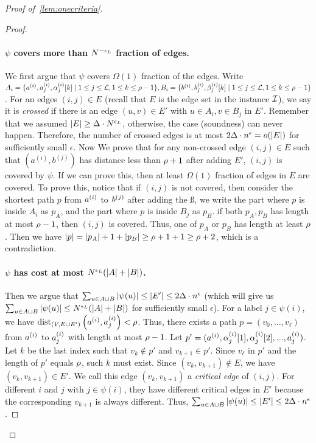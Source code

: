 \begin{proof}[Proof of~\cref{lem:onecriteria}]
\begin{proof}
		\paragraph{$\psi$ covers more than $N^{-\epsl}$ fraction of edges.}	We first argue that $\psi$ covers $\Omega(1)$ fraction of the edges. Write $A_i=\{\a{i},\aa{i}{j},\aaa{i}{j}{k}\mid 1\le j\le \L,1\le k\le \dia{}-1\}, B_i=\{\b{i},\bb{i}{j},\bbb{i}{j}{k}\mid 1\le j\le \L,1\le k\le \dia{}-1\}$. For an edges $(i,j)\in E$ (recall that $E$ is the edge set in the \labcov{} instance $\I$), we say it is \emph{crossed} if there is an edge $(u,v)\in E'$ with $u\in A_i,v\in B_j$ in $E'$. Remember that we assumed $|E|\ge \Delta\cdot N^{\epsl{}}$, otherwise, the case (soundness) can never happen. Therefore, the number of crossed edges is at most $2\AB\cdot n^{\epsilon}=o(|E|)$ for sufficiently small $\epsilon$. Now We prove that for any non-crossed edge $(i,j)\in E$ such that $(a^{(i)},b^{(j)})$ has distance less than $\dia{}+1$ after adding $E'$, $(i,j)$ is covered by $\psi$. If we can prove this, then at least $\Omega(1)$ fraction of edges in $E$ are covered. To prove this, notice that if $(i,j)$ is not covered, then consider the shortest path $p$ from $\a{i}$ to $\b{j}$ after adding the \ss{}, we write the part where $p$ is inside $A_i$ as $p_A$, and the part where $p$ is inside $B_j$ as $p_B$. if both $p_A,p_B$ has length at most $\dia{}-1$, then $(i,j)$ is covered. Thus, one of $p_A$ or $p_B$ has length at least $\dia{}$. Then we have $|p|=|p_A|+1+|p_B|\ge \dia{}+1+1\ge \dia{}+2$, which is a contradiction. 
		
		\paragraph{$\psi$ has cost at most $N^{\epsl}(|A|+|B|)$.} Then we argue that $\sum_{u\in A\cup B}|\psi(u)|\le |E'|\le 2\AB \cdot n^{\epsilon}$ (which will give us $\sum_{u\in A\cup B}|\psi(u)|\le N^{\epsl{}}(|A|+|B|)$ for sufficiently small $\epsilon$). For a label $j\in\psi(i)$, we have $\distt{(V,E\cup E')}{\a{i},\aa{i}{j}}<\dia{}$. Thus, there exists a path $p=(v_0,...,v_{\ell})$ from $\a{i}$ to $\aa{i}{j}$ with length at most $\dia{}-1$. Let $p'=(\a{i},\aaa{i}{j}{1},\aaa{i}{j}{2},...,\aa{i}{j})$. Let $k$ be the last index such that $v_k\not\in p'$ and $v_{k+1}\in p'$. Since $v_{\ell}$ in $p'$ and the length of $p'$ equals $\dia{}$, such $k$ must exist. Since $(v_k,v_{k+1})\not\in E$, we have $(v_k,v_{k+1})\in E'$. We call this edge $(v_k,v_{k+1})$ a \emph{critical edge} of $(i,j)$. For different $i$ and $j$ with $j\in\psi(i)$, they have different critical edges in $E'$ because the corresponding $v_{k+1}$ is always different. Thus, $\sum_{u\in A\cup B}|\psi(u)|\le |E'|\le 2\AB \cdot n^{\epsilon}$.
		

\end{proof}
\end{proof}
